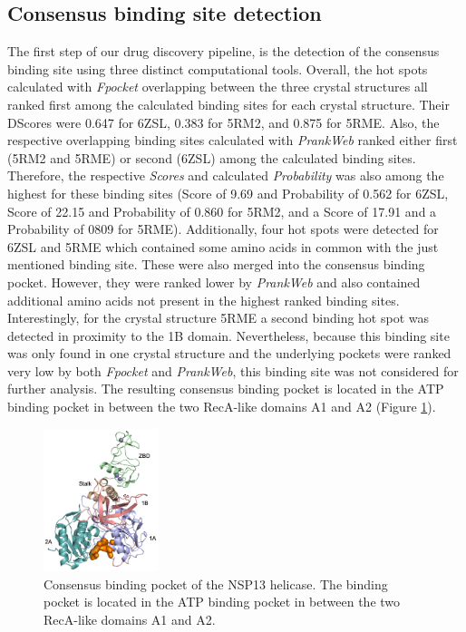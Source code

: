 \documentclass[11pt, letterpaper, titlepage]{article}
\begin{document}
\subsection{Consensus binding site detection}
The first step of our drug discovery pipeline, is the detection of the consensus binding site using three distinct computational tools. 
Overall, the hot spots calculated with \textit{Fpocket} overlapping between the three crystal structures all ranked first among the calculated binding sites for each crystal structure. Their \acp{DScore} were 0.647 for 6ZSL, 0.383 for 5RM2, and 0.875 for 5RME. Also, the respective overlapping binding sites calculated with \textit{PrankWeb} ranked either first (5RM2 and 5RME) or second (6ZSL) among the calculated binding sites. Therefore, the respective \textit{Scores} and calculated \textit{Probability} was also among the highest for these binding sites (Score of 9.69 and Probability of 0.562 for 6ZSL, Score of 22.15 and Probability of 0.860 for 5RM2, and a Score of 17.91 and a Probability of 0809 for 5RME). Additionally, four hot spots were detected for 6ZSL and 5RME which contained some amino acids in common with the just mentioned binding site. These were also merged into the consensus binding pocket. However, they were ranked lower by \textit{PrankWeb} and also contained additional amino acids not present in the highest ranked binding sites. 
Interestingly, for the crystal structure 5RME a second binding hot spot was detected in proximity to the 1B domain. Nevertheless, because this binding site was only found in one crystal structure and the underlying pockets were ranked very low by both \textit{Fpocket} and \textit{PrankWeb}, this binding site was not considered for further analysis.
The resulting consensus binding pocket is located in the ATP binding pocket in between the two RecA-like domains A1 and A2 (Figure \ref{consensus_binding_pocket}). 
\begin{figure}
    \centering
    \includegraphics[width=0.3\textwidth]{consens_domain_big.pdf}
    \caption{Consensus binding pocket of the NSP13 helicase. The binding pocket is located in the ATP binding pocket in between the two RecA-like domains A1 and A2.}
    \label{consensus_binding_pocket}
\end{figure}
\end{document}
